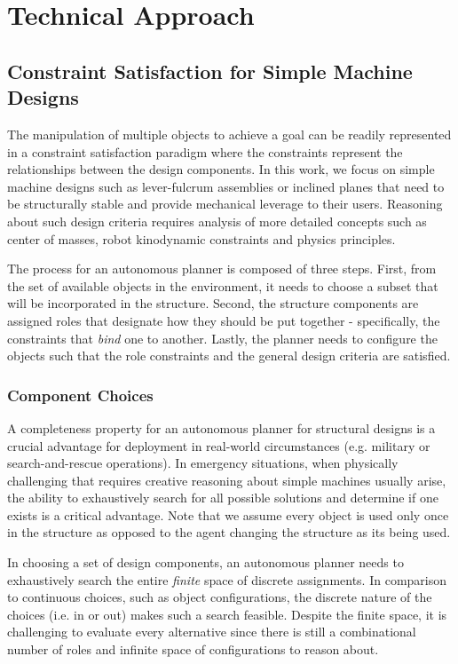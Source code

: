 \documentclass[runningheads,a4paper]{llncs}
\begin{document}
\newpage
\section{Technical Approach}

\subsection{Constraint Satisfaction for Simple Machine Designs}

The manipulation of multiple objects to achieve a goal can be readily represented in a constraint
satisfaction paradigm where the constraints represent the relationships between the design
components. In this work, we focus on simple machine designs such as lever-fulcrum assemblies or
inclined planes that need to be structurally stable and provide mechanical leverage to their users.
Reasoning about such design criteria requires analysis of more detailed concepts such as center
of masses, robot kinodynamic constraints and physics principles. 

The process for an autonomous planner is composed of three steps. First, from the set of available objects
in the environment, it needs to choose a subset that will be incorporated in the structure. Second,
the structure components are assigned roles that designate how they should be put together - specifically,
the constraints that \textit{bind} one to another. Lastly, the planner needs to configure the objects
such that the role constraints and the general design criteria are satisfied. 

\subsubsection{Component Choices}

A completeness property for an autonomous planner for structural designs is a crucial advantage
for deployment in real-world circumstances (e.g. military or search-and-rescue operations). In
emergency situations, when physically challenging that requires creative reasoning about simple
machines usually arise, the ability to exhaustively search for all possible solutions and determine
if one exists is a critical advantage. Note that we assume every object is used only once in the 
structure as opposed to the agent changing the structure as its being used.

In choosing a set of design components, an autonomous planner needs to exhaustively search the 
entire \textit{finite} space of discrete assignments. In comparison to continuous choices, such as
object configurations, the discrete nature of the choices (i.e. in or out) makes such a search
feasible. Despite the finite space, it is challenging to evaluate
every alternative since there is still a combinational number of roles and infinite 
space of configurations to reason about.
\end{document}

